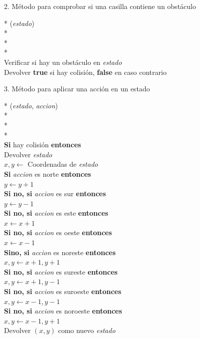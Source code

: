 \documentclass[conference,a4paper]{IEEEtran}
\begin{document}
2. Método para comprobar si una casilla contiene un obstáculo
  \begin{pseudo}*
    (\textit{estado}) \\*
     \\*
     \\*
     \\
    Verificar si hay un obstáculo en \textit{estado} \\
    Devolver \textbf{true} si hay colisión, \textbf{false} en caso contrario
  \end{pseudo}
  
3. Método para aplicar una acción en un estado
  \begin{pseudo}*
    (\textit{estado}, \textit{accion}) \\*
     \\*
     \\*
    \\
    \textbf{Si} hay colisión \textbf{entonces} \\
    \> Devolver \textit{estado} \\
    $x, y \leftarrow$ Coordenadas de \textit{estado} \\
    \textbf{Si} \textit{accion} es norte \textbf{entonces} \\
    \> $y \leftarrow y + 1$ \\
    \textbf{Si no, si} \textit{accion} es sur \textbf{entonces} \\
    \> $y \leftarrow y - 1$ \\
    \textbf{Si no, si} \textit{accion} es este \textbf{entonces} \\
    \> $x \leftarrow x + 1$ \\
    \textbf{Si no, si} \textit{accion} es oeste \textbf{entonces} \\
    \> $x \leftarrow x - 1$ \\
    \textbf{Sino, si} \textit{accion} es noreste \textbf{entonces} \\
    \> $x, y \leftarrow x + 1, y + 1$ \\
    \textbf{Si no, si} \textit{accion} es sureste \textbf{entonces} \\
    \> $x, y \leftarrow x + 1, y - 1$ \\
    \textbf{Si no, si} \textit{accion} es suroeste \textbf{entonces} \\
    \> $x, y \leftarrow x - 1, y - 1$ \\
    \textbf{Si no, si} \textit{accion} es noroeste \textbf{entonces} \\
    \> $x, y \leftarrow x - 1, y + 1$ \\
    Devolver $(x, y)$ como nuevo \textit{estado}
  \end{pseudo}
\end{document}
